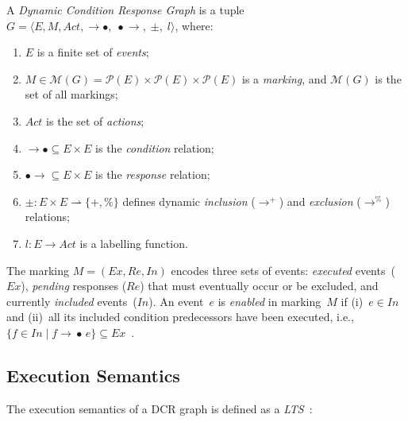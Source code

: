\begin{definition}
\label{def:dcr}
A \emph{Dynamic Condition Response Graph} is a tuple
$G = \langle E, M, \mathit{Act}, \rightarrow\!\bullet,\; \bullet\!\rightarrow,\;
\pm,\; l \rangle$, where:
\begin{enumerate}
  \item $E$ is a finite set of \emph{events};
  \item $M \in \mathcal{M}(G) = \mathcal{P}(E) \times \mathcal{P}(E) \times
    \mathcal{P}(E)$ is a \emph{marking}, and $\mathcal{M}(G)$ is the set of
    all markings;
  \item $\mathit{Act}$ is the set of \emph{actions};
  \item $\rightarrow\!\bullet \subseteq E \times E$ is the \emph{condition}
    relation;
  \item $\bullet\!\rightarrow \subseteq E \times E$ is the \emph{response}
    relation;
  \item $\pm : E \times E \rightharpoonup \{+, \%\}$ defines dynamic
    \emph{inclusion} ($\rightarrow^+$) and \emph{exclusion}
    ($\rightarrow^\%$) relations;
  \item $l : E \rightarrow \mathit{Act}$ is a labelling function.
\end{enumerate}
\end{definition}

The marking $M = (\mathit{Ex}, \mathit{Re}, \mathit{In})$ encodes three sets of
events: \emph{executed} events~($\mathit{Ex}$), \emph{pending} responses
($\mathit{Re}$) that must eventually occur or be excluded, and currently
\emph{included} events~($\mathit{In}$).  An event~$e$ is \emph{enabled} in
marking~$M$ if (i)~$e \in \mathit{In}$ and (ii)~all its included condition
predecessors have been executed, i.e.,
$\{f \in \mathit{In} \mid f \rightarrow\!\bullet\, e\} \subseteq
\mathit{Ex}$~\cite{Diaz2024Pareto-OptimalModels}.

\subsection{Execution Semantics}

The execution semantics of a DCR graph is defined as a \emph{\ac{LTS}}~\cite{Diaz2024Pareto-OptimalModels}:

